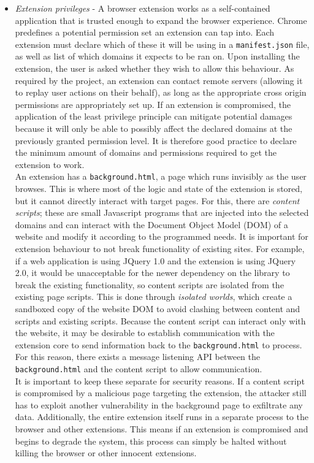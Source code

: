 \begin{itemize}
	\item \emph{Extension privileges} - A browser extension works as a self-contained application that is trusted enough to expand the browser experience. Chrome predefines a potential permission set an extension can tap into. Each extension must declare which of these it will be using in a \texttt{manifest.json} file, as well as list of which domains it expects to be ran on. Upon installing the extension, the user is asked whether they wish to allow this behaviour. As required by the project, an extension can contact remote servers (allowing it to replay user actions on their behalf), as long as the appropriate cross origin permissions are appropriately set up.
	If an extension is compromised, the application of the least privilege principle can mitigate potential damages because it will only be able to possibly affect the declared domains at the previously granted permission level. It is therefore good practice to declare the minimum amount of domains and permissions required to get the extension to work. \\
	
	An extension has a \texttt{background.html}, a page which runs invisibly as the user browses. This is where most of the logic and state of the extension is stored, but it cannot directly interact with target pages. For this, there are \textit{content scripts}; these are small Javascript programs that are injected into the selected domains and can interact with the Document Object Model (DOM) of a website and modify it according to the programmed needs. It is important for extension behaviour to not break functionality of existing sites. For example, if a web application is using JQuery 1.0 and the extension is using JQuery 2.0, it would be unacceptable for the newer dependency on the library to break the existing functionality, so content scripts are isolated from the existing page scripts. This is done through \emph{isolated worlds}, which create a sandboxed copy of the website DOM to avoid clashing between content and scripts and existing scripts. Because the content script can interact only with the website, it may be desirable to establish communication with the extension core to send information back to the \texttt{background.html} to process. For this reason, there exists a message listening API between the \texttt{background.html} and the content script to allow communication. \\
	
	It is important to keep these separate for security reasons. If a content script is compromised by a malicious page targeting the extension, the attacker still has to exploit another vulnerability in the background page to exfiltrate any data. Additionally, the entire extension itself runs in a separate process to the browser and other extensions. This means if an extension is compromised and begins to degrade the system, this process can simply be halted without killing the browser or other innocent extensions. \\
	

\end{itemize}
